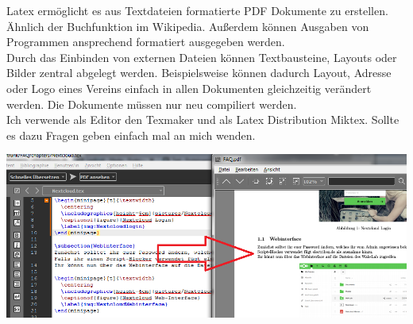 Latex ermöglicht es aus Textdateien formatierte PDF Dokumente zu erstellen. Ähnlich der Buchfunktion im Wikipedia. Außerdem können Ausgaben von Programmen ansprechend formatiert ausgegeben werden.\\
Durch das Einbinden von externen Dateien können Textbausteine, Layouts oder Bilder zentral abgelegt werden. Beispielsweise können dadurch Layout, Adresse oder Logo eines Vereins einfach in allen Dokumenten gleichzeitig verändert werden. Die Dokumente müssen nur neu compiliert werden.\\
Ich verwende als Editor den Texmaker und als Latex Distribution Miktex. Sollte es dazu Fragen geben einfach mal an mich wenden.\\

\begin{minipage}[t]{\textwidth}
  \centering
  \includegraphics[width=\textwidth]{pictures/Texmaker.png}
  \label{img:Texmaker}
\end{minipage}



